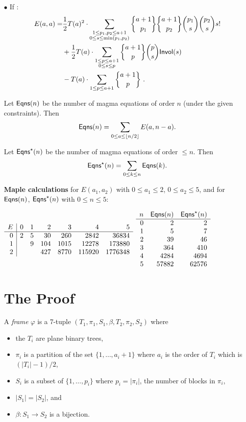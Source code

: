 \documentclass[12pt]{amsart}
\newcommand{\Invol}{{\sf Invol}}
\newcommand{\Eqns}{{\sf Eqns}}
\begin{document}
$\bullet$ If : 
\begin{align*}
E(a,a) = &\frac{1}{2} T(a)^2\cdot \sum_{\substack{1 \le p_1,p_2 \le a+1\\ 0\le s \le \min(p_1,p_2)}} 
{a+1 \brace p_1} {a+1 \brace p_2} {p_1 \choose s} {p_2 \choose s} s! \\
&+ \frac{1}{2} T(a) \cdot \sum_{\substack{1 \le p \le a+1\\ 0\le s \le p}} 
{a+1 \brace p}  {p \choose s}  \Invol(s)\\
&- T(a)\cdot \sum_{1\le p \le a+1}  {a+1 \brace p} \ .
\end{align*}

Let $\Eqns(n)$ be the number of magma equations of order $n$ (under the given constraints). Then
$$
\Eqns (n) = \sum_{0 \le a \le \lfloor n/2 \rfloor } E(a,n-a) .
$$

Let $\Eqns^\star(n)$ be the number of magma equations of order $\le n$. Then
$$
\Eqns^\star(n) = \sum_{0 \le k \le n} \Eqns (k) .
$$

{\bf Maple calculations} for $E(a_1,a_2)$ with $0\le a_1 \le 2$, $0 \le a_2 \le 5$, and for
$\Eqns(n)$, $\Eqns^\star(n)$ with $0\le n \le 5$:
\bigskip

$
\begin{array}{ r | r  r  r  r  r  r}
E& 0 & 1 & 2 & 3 & 4 & 5\\
\hline
0& 2 & 5 & 30 & 260 & 2842 & 36834\\
1&  & 9 & 104 & 1015 & 12278 & 173880\\
2&  &  & 427 & 8770 & 115920 & 1776348\\
\end{array}
$
\qquad
$
\begin{array} {r r r}
n &\Eqns(n) & \Eqns^\star(n)\\
\hline
0 & 2 & 2\\
1 & 5 & 7\\
2 & 39 & 46\\
3 & 364 & 410\\
4 & 4284 & 4694\\
5 & 57882 & 62576
\end{array}
$
\newpage

\section{The Proof}

A {\em frame} $\varphi$ is a 7-tuple $(T_1,\pi_1,S_1, \beta, T_2, \pi_2, S_2)$ where 
\begin{itemize} 
\item the $T_i$ are plane binary trees, 
\item $\pi_i$ is a partition of the set $\{1,\ldots,a_i + 1\}$ where $a_i$ is the 
order of $T_i$ which is $(|T_i| -1)/2$,
\item $S_i$ is a subset of $\{1,\ldots,p_i\}$ where $p_i = |\pi_i|$, the number of blocks in $\pi_i$,
\item $|S_1| = |S_2|$, and
\item $\beta : S_1 \rightarrow S_2$ is a bijection.
\end{itemize}
\end{document}
